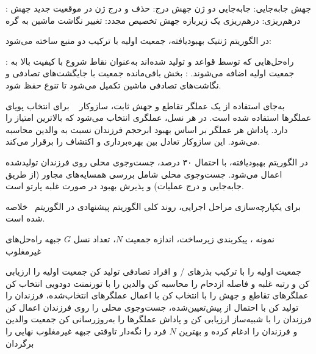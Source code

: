 :
 جهش جابه‌جایی: جابه‌جایی دو ژن
 جهش درج: حذف و درج ژن در موقعیت جدید
 جهش درهم‌ریزی: درهم‌ریزی یک زیربازه
 جهش تخصیص مجدد: تغییر نگاشت ماشین به گره



در الگوریتم ژنتیک بهبودیافته، جمعیت اولیه با ترکیب دو منبع ساخته می‌شود:

 : راه‌حل‌هایی که توسط قواعد  و  تولید شده‌اند
به‌عنوان نقاط شروع با کیفیت بالا به جمعیت اولیه اضافه می‌شوند.
 : بخش باقی‌مانده جمعیت با جایگشت‌های تصادفی و نگاشت‌های تصادفی ماشین تکمیل می‌شود تا تنوع حفظ شود.



به‌جای استفاده از یک عملگر تقاطع و جهش ثابت،
سازوکار ~\cite{auer2002finite} برای انتخاب پویای عملگرها استفاده شده است.
در هر نسل، عملگری انتخاب می‌شود که بالاترین امتیاز  را دارد.
پاداش هر عملگر بر اساس بهبود ابرحجم فرزندان نسبت به والدین محاسبه می‌شود.
این سازوکار تعادل بین بهره‌برداری
و اکتشاف را برقرار می‌کند.



در الگوریتم بهبودیافته، با احتمال ۳۰ درصد،
جست‌وجوی محلی روی فرزندان تولیدشده اعمال می‌شود.
جست‌وجوی محلی شامل بررسی همسایه‌های مجاور
(از طریق جابه‌جایی و درج عملیات)
و پذیرش بهبود در صورت غلبه پارتو است.



برای یکپارچه‌سازی مراحل اجرایی، روند کلی الگوریتم پیشنهادی
در الگوریتم~ خلاصه شده است.

 نمونه ، پیکربندی زیرساخت، اندازه جمعیت $N$، تعداد نسل $G$
 جبهه راه‌حل‌های غیرمغلوب

 جمعیت اولیه را با ترکیب بذرهای / و افراد تصادفی تولید کن
 جمعیت اولیه را ارزیابی کن و رتبه غلبه و فاصله ازدحام را محاسبه کن
 والدین را با تورنمنت دودویی انتخاب کن
 عملگرهای تقاطع و جهش را با  انتخاب کن
 با اعمال عملگرهای انتخاب‌شده، فرزندان را تولید کن
 با احتمال از پیش‌تعیین‌شده، جست‌وجوی محلی را روی فرزندان اعمال کن
 فرزندان را با شبیه‌ساز ارزیابی کن و پاداش عملگرها را به‌روزرسانی کن
 جمعیت والدین و فرزندان را ادغام کرده و بهترین $N$ فرد را نگه‌دار
‌تاوقتی
 جبهه غیرمغلوب نهایی را برگردان


